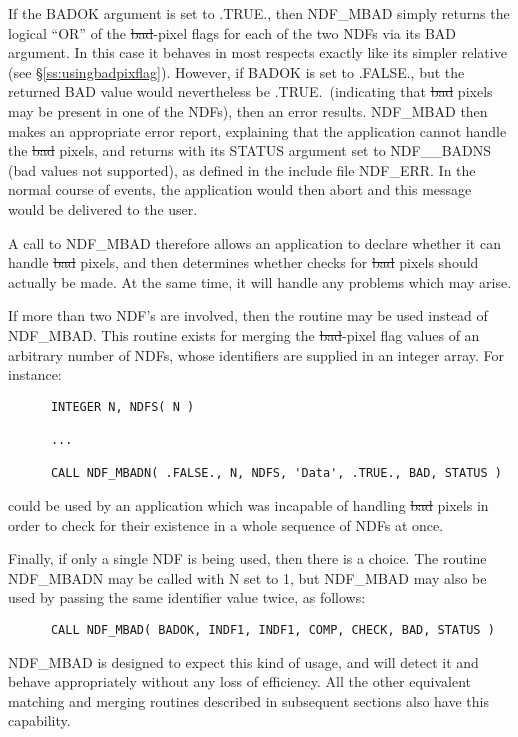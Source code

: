 If the BADOK argument is set to .TRUE., then NDF\_MBAD simply returns
the logical ``OR'' of the \st{bad\/}-pixel flags for each of the two NDFs via 
its BAD argument.
In this case it behaves in most respects exactly like its simpler relative
 (see \S\ref{ss:usingbadpixflag}). 
However, if BADOK is set to .FALSE., but the returned BAD value would
nevertheless be .TRUE.\ (indicating that \st{bad\/} pixels may be present in
one of the NDFs), then an error results. 
NDF\_MBAD then makes an appropriate error report, explaining that the
application cannot handle the \st{bad\/} pixels, and returns with its STATUS
argument set to NDF\_\_BADNS (bad values not supported), as defined in the
include file NDF\_ERR. 
In the normal course of events, the application would then abort and this
message would be delivered to the user. 

A call to NDF\_MBAD therefore allows an application to declare whether it
can handle \st{bad\/} pixels, and then determines whether checks for \st{bad\/}
pixels should actually be made. 
At the same time, it will handle any problems which may arise. 

If more than two NDF's are involved, then the routine  may be 
used instead of NDF\_MBAD.
This routine exists for merging the \st{bad}-pixel flag values of an
arbitrary number of NDFs, whose identifiers are supplied in an integer
array. 
For instance: 

\small
\begin{verbatim}
      INTEGER N, NDFS( N )

      ...

      CALL NDF_MBADN( .FALSE., N, NDFS, 'Data', .TRUE., BAD, STATUS )
\end{verbatim}
\normalsize

could be used by an application which was incapable of handling \st{bad\/}
pixels in order to check for their existence in a whole sequence of NDFs at
once. 

Finally, if only a single NDF is being used, then there is a choice. 
The routine NDF\_MBADN may be called with N set to 1, but NDF\_MBAD may also
be used by passing the same identifier value twice, as follows: 

\small
\begin{verbatim}
      CALL NDF_MBAD( BADOK, INDF1, INDF1, COMP, CHECK, BAD, STATUS )
\end{verbatim}
\normalsize

NDF\_MBAD is designed to expect this kind of usage, and will detect it and
behave appropriately without any loss of efficiency. 
All the other equivalent matching and merging routines described in
subsequent sections also have this capability. 

